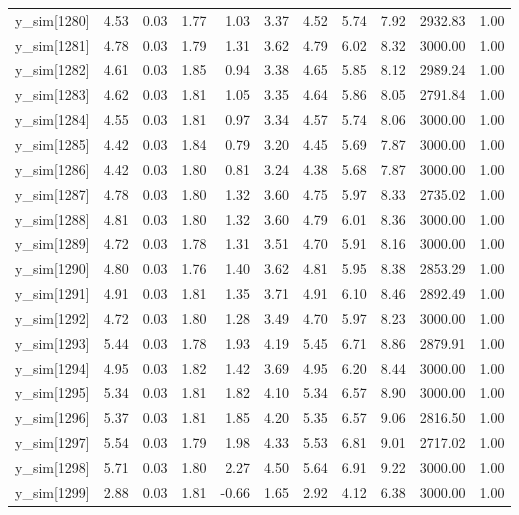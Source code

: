 \begin{table}[ht]
\begin{tabular}{rrrrrrrrrrr}
  y\_sim[1280] & 4.53 & 0.03 & 1.77 & 1.03 & 3.37 & 4.52 & 5.74 & 7.92 & 2932.83 & 1.00 \\ 
  y\_sim[1281] & 4.78 & 0.03 & 1.79 & 1.31 & 3.62 & 4.79 & 6.02 & 8.32 & 3000.00 & 1.00 \\ 
  y\_sim[1282] & 4.61 & 0.03 & 1.85 & 0.94 & 3.38 & 4.65 & 5.85 & 8.12 & 2989.24 & 1.00 \\ 
  y\_sim[1283] & 4.62 & 0.03 & 1.81 & 1.05 & 3.35 & 4.64 & 5.86 & 8.05 & 2791.84 & 1.00 \\ 
  y\_sim[1284] & 4.55 & 0.03 & 1.81 & 0.97 & 3.34 & 4.57 & 5.74 & 8.06 & 3000.00 & 1.00 \\ 
  y\_sim[1285] & 4.42 & 0.03 & 1.84 & 0.79 & 3.20 & 4.45 & 5.69 & 7.87 & 3000.00 & 1.00 \\ 
  y\_sim[1286] & 4.42 & 0.03 & 1.80 & 0.81 & 3.24 & 4.38 & 5.68 & 7.87 & 3000.00 & 1.00 \\ 
  y\_sim[1287] & 4.78 & 0.03 & 1.80 & 1.32 & 3.60 & 4.75 & 5.97 & 8.33 & 2735.02 & 1.00 \\ 
  y\_sim[1288] & 4.81 & 0.03 & 1.80 & 1.32 & 3.60 & 4.79 & 6.01 & 8.36 & 3000.00 & 1.00 \\ 
  y\_sim[1289] & 4.72 & 0.03 & 1.78 & 1.31 & 3.51 & 4.70 & 5.91 & 8.16 & 3000.00 & 1.00 \\ 
  y\_sim[1290] & 4.80 & 0.03 & 1.76 & 1.40 & 3.62 & 4.81 & 5.95 & 8.38 & 2853.29 & 1.00 \\ 
  y\_sim[1291] & 4.91 & 0.03 & 1.81 & 1.35 & 3.71 & 4.91 & 6.10 & 8.46 & 2892.49 & 1.00 \\ 
  y\_sim[1292] & 4.72 & 0.03 & 1.80 & 1.28 & 3.49 & 4.70 & 5.97 & 8.23 & 3000.00 & 1.00 \\ 
  y\_sim[1293] & 5.44 & 0.03 & 1.78 & 1.93 & 4.19 & 5.45 & 6.71 & 8.86 & 2879.91 & 1.00 \\ 
  y\_sim[1294] & 4.95 & 0.03 & 1.82 & 1.42 & 3.69 & 4.95 & 6.20 & 8.44 & 3000.00 & 1.00 \\ 
  y\_sim[1295] & 5.34 & 0.03 & 1.81 & 1.82 & 4.10 & 5.34 & 6.57 & 8.90 & 3000.00 & 1.00 \\ 
  y\_sim[1296] & 5.37 & 0.03 & 1.81 & 1.85 & 4.20 & 5.35 & 6.57 & 9.06 & 2816.50 & 1.00 \\ 
  y\_sim[1297] & 5.54 & 0.03 & 1.79 & 1.98 & 4.33 & 5.53 & 6.81 & 9.01 & 2717.02 & 1.00 \\ 
  y\_sim[1298] & 5.71 & 0.03 & 1.80 & 2.27 & 4.50 & 5.64 & 6.91 & 9.22 & 3000.00 & 1.00 \\ 
  y\_sim[1299] & 2.88 & 0.03 & 1.81 & -0.66 & 1.65 & 2.92 & 4.12 & 6.38 & 3000.00 & 1.00 \\ 

\end{tabular}
\end{table}
